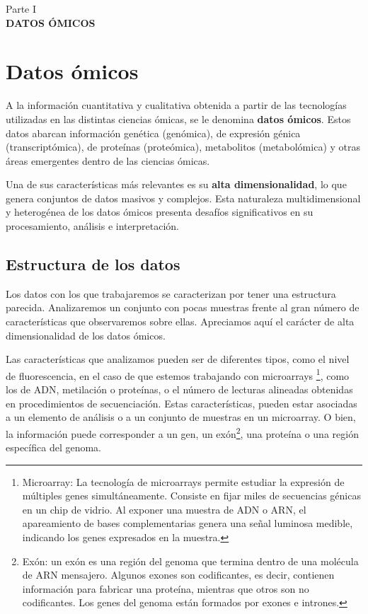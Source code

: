 \thispagestyle{empty}
\vspace*{\fill}
\begin{center}
    \large Parte I \\
    \vspace{0.5cm}           
    \LARGE \textbf{DATOS ÓMICOS}
\end{center}
\vspace*{\fill}
\newpage
\setcounter{page}{1}  %

\newpage


\section{Datos ómicos}

A la información cuantitativa y cualitativa obtenida a partir de las tecnologías utilizadas
en las distintas ciencias ómicas, se le denomina \textbf{datos ómicos}. Estos datos abarcan 
información genética (genómica), de expresión génica (transcriptómica), de proteínas (proteómica),
metabolitos (metabolómica) y otras áreas emergentes dentro de las ciencias ómicas.

Una de sus características más relevantes es su \textbf{alta dimensionalidad}, lo que genera conjuntos de datos 
masivos y complejos. Esta naturaleza multidimensional y heterogénea de los datos ómicos presenta 
desafíos significativos en su procesamiento, análisis e interpretación.

\subsection{Estructura de los datos}

Los datos con los que trabajaremos se caracterizan por tener una estructura parecida. Analizaremos un
conjunto con pocas muestras frente al gran número de características que observaremos sobre ellas. Apreciamos
aquí el carácter de alta dimensionalidad de los datos ómicos. \newline

Las características que analizamos pueden ser de diferentes tipos, como el nivel de fluorescencia, en el caso
de que estemos trabajando con microarrays \footnote[1]{Microarray: La tecnología de microarrays permite estudiar 
la expresión de múltiples genes simultáneamente. Consiste en fijar miles de secuencias génicas en un chip de vidrio. 
Al exponer una muestra de ADN o ARN, el apareamiento de bases complementarias genera una señal luminosa medible, 
indicando los genes expresados en la muestra.}, como los de ADN, metilación o proteínas, o el número de lecturas 
alineadas obtenidas en procedimientos de secuenciación. Estas características, pueden estar asociadas a un
elemento de análisis o a un conjunto de muestras en un microarray. O bien, la información puede corresponder a
un gen, un exón\footnote[2]{Exón: un exón es una región del genoma que termina dentro de una molécula de ARN mensajero.
Algunos exones son codificantes, es decir, contienen información para fabricar una proteína, mientras que otros 
son no codificantes. Los genes del genoma están formados por exones e intrones.},
una proteína o una región específica del genoma. \newline

